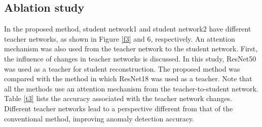 \documentclass[letterpaper, 10 pt, conference]{ieeeconf}
\begin{document}
\begin{table}[t]
\begin{center}
\caption{Accuracy while changing teacher network for reconstruction student}
\label{t3}
\end{center}
\end{table}


\begin{table}[t]
\begin{center}
\caption{Accuracy with/without attention mechanism}
\label{t4}
\end{center}
\end{table}



\subsection{Ablation study}

In the proposed method, student network1 and student network2 have different teacher networks, as shown in Figure \ref{f3} and 6, respectively. An attention mechanism was also used from the teacher network to the student network. First, the influence of changes in teacher networks is discussed. In this study, ResNet50 was used as a teacher for student reconstruction. The proposed method was compared with the method in which ResNet18 was used as a teacher. Note that all the methods use an attention mechanism from the teacher-to-student network. Table \ref{t3} lists the accuracy associated with the teacher network changes. Different teacher networks lead to a perspective different from that of the conventional method, improving anomaly detection accuracy.
\end{document}
